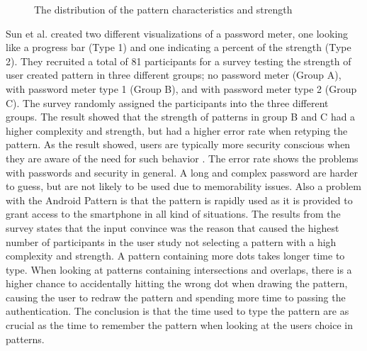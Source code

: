\begin{figure}[H]
{        \label{fig:patterngraph3}
      }
      \caption{The distribution of the pattern characteristics and strength \cite{Sun}}
      \label{fig:patterngraph}
    \end{figure}

  Sun et al. \cite{Sun} created two different visualizations of a password meter, one looking like a progress bar (Type 1) and one indicating a percent of the strength (Type 2). They recruited a total of 81 participants for a survey testing the strength of user created pattern in three different groups; no password meter (Group A), with password meter type 1 (Group B), and with password meter type 2 (Group C). The survey randomly assigned the participants into the three different groups. The result showed that the strength of patterns in group B and C had a higher complexity and strength, but had a higher error rate when retyping the pattern. As the result showed, users are typically more security conscious when they are aware of the need for such behavior \cite{Sasse}. The error rate shows the problems with passwords and security in general. A long and complex password are harder to guess, but are not likely to be used due to memorability issues. Also a problem with the Android Pattern is that the pattern is rapidly used as it is provided to grant access to the smartphone in all kind of situations. The results from the survey states that the input convince was the reason that caused the highest number of participants in the user study not selecting a pattern with a high complexity and strength. A pattern containing more dots takes longer time to type. When looking at patterns containing intersections and overlaps, there is a higher chance to accidentally hitting the wrong dot when drawing the pattern, causing the user to redraw the pattern and spending more time to passing the authentication. The conclusion is that the time used to type the pattern are as crucial as the time to remember the pattern when looking at the users choice in patterns.

